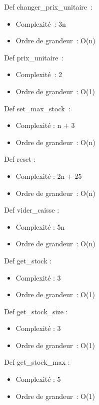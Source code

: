 \documentclass[]{article}
\begin{document}
Def changer\_prix\_unitaire~:

\begin{itemize}
\item
  Complexité~: 3n
\item
  Ordre de grandeur~: O(n)
\end{itemize}

Def prix\_unitaire~:

\begin{itemize}
\item
  Complexité~: 2
\item
  Ordre de grandeur~: O(1)
\end{itemize}

Def set\_max\_stock~:

\begin{itemize}
\item
  Complexité : n + 3
\item
  Ordre de grandeur~: O(n)
\end{itemize}

Def reset :

\begin{itemize}
\item
  Complexité : 2n + 25
\item
  Ordre de grandeur~: O(n)
\end{itemize}

Def vider\_caisse :

\begin{itemize}
\item
  Complexité : 5n
\item
  Ordre de grandeur~: O(n)
\end{itemize}

Def get\_stock :

\begin{itemize}
\item
  Complexité : 3
\item
  Ordre de grandeur~: O(1)
\end{itemize}

Def get\_stock\_size :

\begin{itemize}
\item
  Complexité : 3
\item
  Ordre de grandeur~: O(1)
\end{itemize}

Def get\_stock\_max :

\begin{itemize}
\item
  Complexité : 5
\item
  Ordre de grandeur~: O(1)
\end{itemize}
\end{document}
